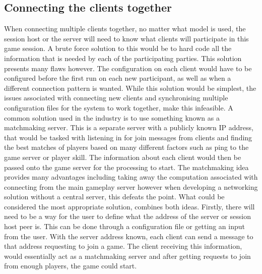 \subsection{Connecting the clients together} \label{sec:client_connections}
When connecting multiple clients together, no matter what model is used, the session host or the server will need to know what clients will participate in this game session. A brute force solution to this would be to hard code all the information that is needed by each of the participating parties. This solution presents many flaws however. The configuration on each client would have to be configured before the first run on each new participant, as well as when a different connection pattern is wanted. While this solution would be simplest, the issues associated with connecting new clients and synchronising multiple configuration files for the system to work together, make this infeasible.
A common solution used in the industry is to use something known as a matchmaking server. This is a separate server with a publicly known IP address, that would be tasked with listening in for join messages from clients and finding the best matches of players based on many different factors such as ping to the game server or player skill. The information about each client would then be passed onto the game server for the processing to start. The matchmaking idea provides many advantages including taking away the computation associated with connecting from the main gameplay server however when developing a networking solution without a central server, this defeats the point.
What could be considered the most appropriate solution, combines both ideas. Firstly, there will need to be a way for the user to define what the address of the server or session host peer is. This can be done through a configuration file or getting an input from the user. With the server address known, each client can send a message to that address requesting to join a game. The client receiving this information, would essentially act as a matchmaking server and after getting requests to join from enough players, the game could start.

